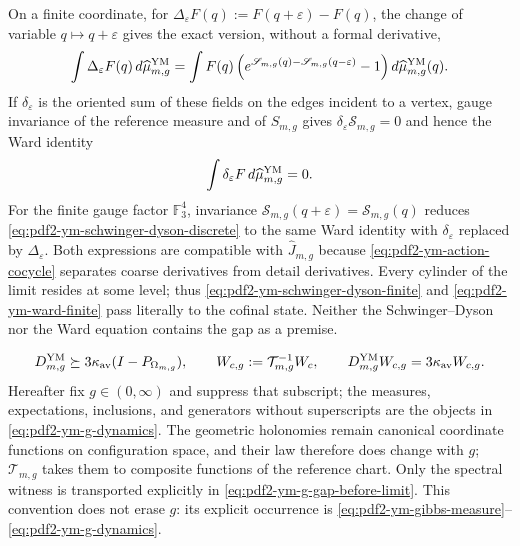 On a finite coordinate, for
$\Delta_\varepsilon F(q):=F(q+\varepsilon)-F(q)$, the change of variable
$q\mapsto q+\varepsilon$ gives the exact version, without a formal derivative,
\begin{equation}\label{eq:pdf2-ym-schwinger-dyson-discrete}
 \int\Delta_\varepsilon F(q)\,d\widehat\mu_{m,g}^{\rm YM}
 =\int F(q)
  \left(e^{\mathscr S_{m,g}(q)-\mathscr S_{m,g}(q-\varepsilon)}-1\right)
  d\widehat\mu_{m,g}^{\rm YM}(q).
\end{equation}
If $\delta_\varepsilon$ is the oriented sum of these fields on the edges
incident to a vertex, gauge invariance of the reference measure and of
$S_{m,g}$ gives $\delta_\varepsilon\mathscr S_{m,g}=0$ and hence the Ward identity
\begin{equation}\label{eq:pdf2-ym-ward-finite}
 \int\delta_\varepsilon F\,d\widehat\mu_{m,g}^{\rm YM}=0.
\end{equation}
For the finite gauge factor $\mathbb F_3^4$, invariance
$\mathscr S_{m,g}(q+\varepsilon)=\mathscr S_{m,g}(q)$ reduces
\eqref{eq:pdf2-ym-schwinger-dyson-discrete} to the same Ward identity with
$\delta_\varepsilon$ replaced by $\Delta_\varepsilon$.
Both expressions are compatible with $\widehat J_{m,g}$ because
\eqref{eq:pdf2-ym-action-cocycle} separates coarse derivatives from detail derivatives.
Every cylinder of the limit resides at some level; thus
\eqref{eq:pdf2-ym-schwinger-dyson-finite} and
\eqref{eq:pdf2-ym-ward-finite} pass literally to the cofinal state. Neither the
Schwinger--Dyson nor the Ward equation contains the gap as a premise.

\begin{equation}\label{eq:pdf2-ym-g-gap-before-limit}
 D_{m,g}^{\rm YM}\succeq3\kappa_{\rm av}
 (I-P_{\Omega_{m,g}}),
 \qquad
 W_{c,g}:=\mathcal T_{m,g}^{-1}W_c,
 \qquad
 D_{m,g}^{\rm YM}W_{c,g}=3\kappa_{\rm av}W_{c,g}.
\end{equation}
Hereafter fix $g\in(0,\infty)$ and suppress that subscript; the
measures, expectations, inclusions, and generators without superscripts are the objects
in \eqref{eq:pdf2-ym-g-dynamics}. The geometric holonomies remain
canonical coordinate functions on configuration space, and their
law therefore does change with $g$; $\mathcal T_{m,g}$ takes them to composite functions of the
reference chart. Only the spectral witness is transported explicitly in
\eqref{eq:pdf2-ym-g-gap-before-limit}. This convention does not erase $g$: its explicit occurrence is
\eqref{eq:pdf2-ym-gibbs-measure}--\eqref{eq:pdf2-ym-g-dynamics}.

